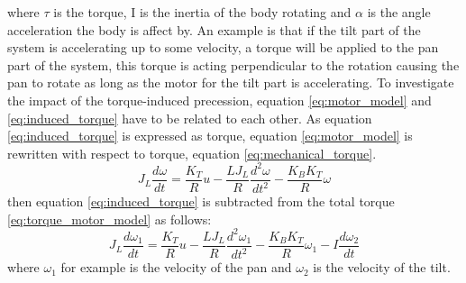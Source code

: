 where $\tau$ is the torque, I is the inertia of the body rotating and $\alpha$ is the angle acceleration the body is affect by. An example is that if the tilt part of the system is accelerating up to some velocity, a torque will be applied to the pan part of the system, this torque is acting perpendicular to the rotation causing the pan to rotate as long as the motor for the tilt part is accelerating. To investigate the impact of the torque-induced precession, equation \ref{eq:motor_model} and \ref{eq:induced_torque} have to be related to each other. As equation \ref{eq:induced_torque} is expressed as torque, equation \ref{eq:motor_model} is rewritten with respect to torque, equation \ref{eq:mechanical_torque}.
\begin{equation}
	J_L \frac{d\omega}{dt} = \frac{K_T}{R} u - \frac{L J_L}{R} \frac{d^{2}\omega}{dt^{2}} - \frac{K_B K_T}{R} \omega\label{eq:torque_motor_model}
\end{equation}
then equation \ref{eq:induced_torque} is subtracted from the total torque \ref{eq:torque_motor_model} as follows:
\begin{equation}
	J_L \frac{d\omega_{1}}{dt} = \frac{K_T}{R} u - \frac{L J_L}{R} \frac{d^{2}\omega_{1}}{dt^{2}} - \frac{K_B K_T}{R} \omega_{1} - I \frac{d\omega_{2}}{dt}\label{eq:coupled_torque_motor_model}
\end{equation}
where $\omega_1$ for example is the velocity of the pan and $\omega_2$ is the velocity of the tilt. 

